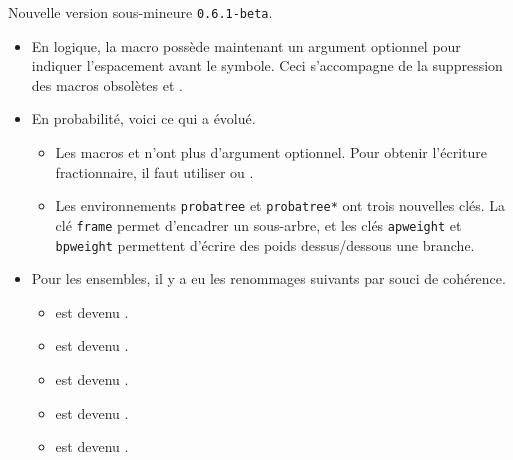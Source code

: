 Nouvelle version sous-mineure \verb+0.6.1-beta+.

\begin{itemize}[itemsep=.5em]
    \item En logique, la macro  possède maintenant un argument optionnel pour indiquer l'espacement avant le symbole.
          Ceci s'accompagne de la suppression des macros obsolètes  et .




    \item En probabilité, voici ce qui a évolué.
    \begin{itemize}[itemsep=.5em]
        \item Les macros  et  n'ont plus d'argument optionnel. Pour obtenir l'écriture fractionnaire, il faut utiliser  ou .

        \item Les environnements \verb+probatree+ et \verb+probatree*+ ont trois nouvelles clés.
              La clé \verb+frame+ permet d'encadrer un sous-arbre, et les clés \verb+apweight+ et \verb+bpweight+ permettent d'écrire des poids dessus/dessous une branche.
    \end{itemize}




    \item Pour les ensembles, il y a eu les renommages suivants par souci de cohérence.
    \begin{itemize}[itemsep=.5em]
        \item {} est devenu .

        \item {} est devenu .

        \item {} est devenu .

        \item {} est devenu .

        \item {} est devenu .
    \end{itemize}
\end{itemize}
